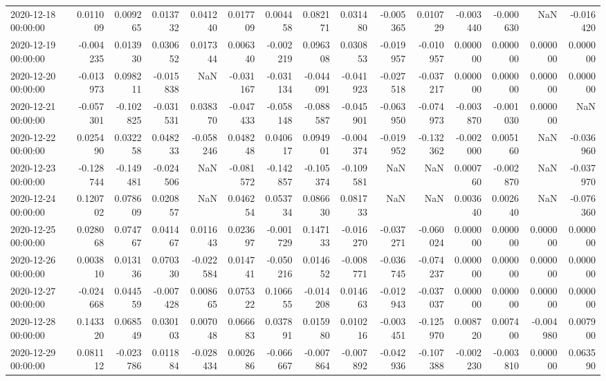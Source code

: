 \begin{tabular}{lrrrrrrrrrrrrrr}
2020-12-18 00:00:00 & 0.011009 & 0.009265 & 0.013732 & 0.041240 & 0.017709 & 0.004458 & 0.082171 & 0.031480 & -0.005365 & 0.010729 & -0.003440 & -0.000630 & NaN & -0.016420 \\
2020-12-19 00:00:00 & -0.004235 & 0.013930 & 0.030652 & 0.017344 & 0.006340 & -0.002219 & 0.096308 & 0.030853 & -0.019957 & -0.010957 & 0.000000 & 0.000000 & 0.000000 & 0.000000 \\
2020-12-20 00:00:00 & -0.013973 & 0.098211 & -0.015838 & NaN & -0.031167 & -0.031134 & -0.044091 & -0.041923 & -0.027518 & -0.037217 & 0.000000 & 0.000000 & 0.000000 & 0.000000 \\
2020-12-21 00:00:00 & -0.057301 & -0.102825 & -0.031531 & 0.038370 & -0.047433 & -0.058148 & -0.088587 & -0.045901 & -0.063950 & -0.074973 & -0.003870 & -0.001030 & 0.000000 & NaN \\
2020-12-22 00:00:00 & 0.025490 & 0.032258 & 0.048233 & -0.058246 & 0.048248 & 0.040617 & 0.094901 & -0.004374 & -0.019952 & -0.132362 & -0.002000 & 0.005160 & NaN & -0.036960 \\
2020-12-23 00:00:00 & -0.128744 & -0.149481 & -0.024506 & NaN & -0.081572 & -0.142857 & -0.105374 & -0.109581 & NaN & NaN & 0.000760 & -0.002870 & NaN & -0.037970 \\
2020-12-24 00:00:00 & 0.120702 & 0.078609 & 0.020857 & NaN & 0.046254 & 0.053734 & 0.086630 & 0.081733 & NaN & NaN & 0.003640 & 0.002640 & NaN & -0.076360 \\
2020-12-25 00:00:00 & 0.028068 & 0.074767 & 0.041467 & 0.011643 & 0.023697 & -0.001729 & 0.147133 & -0.016270 & -0.037271 & -0.060024 & 0.000000 & 0.000000 & 0.000000 & 0.000000 \\
2020-12-26 00:00:00 & 0.003810 & 0.013136 & 0.070330 & -0.022584 & 0.014741 & -0.050216 & 0.014652 & -0.008771 & -0.036745 & -0.074237 & 0.000000 & 0.000000 & 0.000000 & 0.000000 \\
2020-12-27 00:00:00 & -0.024668 & 0.044559 & -0.007428 & 0.008665 & 0.075322 & 0.106655 & -0.014208 & 0.014663 & -0.012943 & -0.037037 & 0.000000 & 0.000000 & 0.000000 & 0.000000 \\
2020-12-28 00:00:00 & 0.143320 & 0.068549 & 0.030103 & 0.007048 & 0.066683 & 0.037891 & 0.015980 & 0.010216 & -0.003451 & -0.125970 & 0.008720 & 0.007400 & -0.004980 & 0.007900 \\
2020-12-29 00:00:00 & 0.081112 & -0.023786 & 0.011884 & -0.028434 & 0.002686 & -0.066667 & -0.007864 & -0.007892 & -0.042936 & -0.107388 & -0.002230 & -0.003810 & 0.000000 & 0.063590 \\

\end{tabular}
